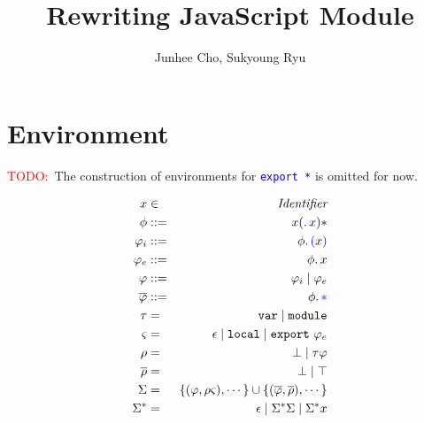 \documentclass[a4paper]{article}
\title{Rewriting JavaScript Module \\
       \fbox{\small\it Working Draft}}
\author{Junhee Cho, Sukyoung Ryu}
\newcommand{\Identifier}{\emph{Identifier}}
\newcommand{\var}{{\tt{var}}}
\newcommand{\module}{{\tt{module}}}
\newcommand{\local}{{\tt{local}}}
\newcommand{\export}{{\tt{export}}}
\newcommand{\code}[1]{\textcolor{blue}{\tt #1}}
\newcommand{\mydot}{.\,}
\newcommand{\TODO}{\mbox{\textcolor{red}{TODO:}\ }}
\begin{document}
\maketitle

\section{Environment}

\TODO The construction of environments for \code{export *} is omitted for now.

\begin{eqnarray*}
x & \in & \Identifier \\
\phi & ::= & x(\code{\mydot}x)* \\
\varphi_i & ::= & \phi\code{\mydot(}x\code{)} \\
\varphi_e & ::= & \phi\mydot x \\
\varphi & ::= & \varphi_i \mid \varphi_e \\
\overline{\varphi} & ::= & \phi\code{\mydot*} \\
\tau & = & \var \mid \module \\
\varsigma & = & \epsilon \mid \local \mid \export\ \varphi_e \\
\rho & = & \bot \mid \tau \varphi \\
\overline{\rho} & = & \bot \mid \top \\
\Sigma & = & \{(\varphi, \rho \varsigma), \cdots\} \cup \{(\overline{\varphi}, \overline{\rho}), \cdots\} \\
\Sigma^* & = & \epsilon \mid \Sigma^* \Sigma \mid \Sigma^* x
\end{eqnarray*}
\end{document}
